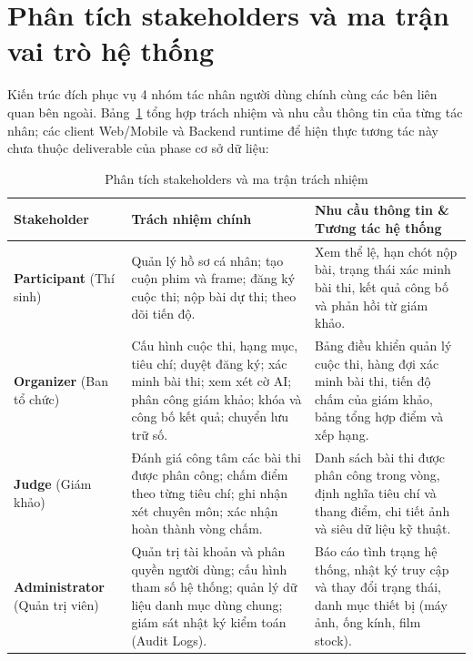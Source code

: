 \clearpage
\section{Phân tích stakeholders và ma trận vai trò hệ thống}
\label{s:c1_stakeholders}

Kiến trúc đích phục vụ 4 nhóm tác nhân người dùng chính cùng các bên liên quan bên ngoài. Bảng~\ref{tab:c1_stakeholders} tổng hợp trách nhiệm và nhu cầu thông tin của từng tác nhân; các client Web/Mobile và Backend runtime để hiện thực tương tác này chưa thuộc deliverable của phase cơ sở dữ liệu:

\begin{table}[!ht]
\centering
\caption{Phân tích stakeholders và ma trận trách nhiệm}
\label{tab:c1_stakeholders}
\small
\begin{tabularx}{\textwidth}{p{2.8cm}p{4.2cm}>{\raggedright\arraybackslash}X}
\toprule
\textbf{Stakeholder} & \textbf{Trách nhiệm chính} & \textbf{Nhu cầu thông tin \& Tương tác hệ thống} \\
\midrule
\textbf{Participant} \newline (Thí sinh) & 
Quản lý hồ sơ cá nhân; tạo cuộn phim và frame; đăng ký cuộc thi; nộp bài dự thi; theo dõi tiến độ. & 
Xem thể lệ, hạn chót nộp bài, trạng thái xác minh bài thi, kết quả công bố và phản hồi từ giám khảo. \\
\midrule
\textbf{Organizer} \newline (Ban tổ chức) & 
Cấu hình cuộc thi, hạng mục, tiêu chí; duyệt đăng ký; xác minh bài thi; xem xét cờ AI; phân công giám khảo; khóa và công bố kết quả; chuyển lưu trữ số. & 
Bảng điều khiển quản lý cuộc thi, hàng đợi xác minh bài thi, tiến độ chấm của giám khảo, bảng tổng hợp điểm và xếp hạng. \\
\midrule
\textbf{Judge} \newline (Giám khảo) & 
Đánh giá công tâm các bài thi được phân công; chấm điểm theo từng tiêu chí; ghi nhận xét chuyên môn; xác nhận hoàn thành vòng chấm. & 
Danh sách bài thi được phân công trong vòng, định nghĩa tiêu chí và thang điểm, chi tiết ảnh và siêu dữ liệu kỹ thuật. \\
\midrule
\textbf{Administrator} \newline (Quản trị viên) & 
Quản trị tài khoản và phân quyền người dùng; cấu hình tham số hệ thống; quản lý dữ liệu danh mục dùng chung; giám sát nhật ký kiểm toán (Audit Logs). & 
Báo cáo tình trạng hệ thống, nhật ký truy cập và thay đổi trạng thái, danh mục thiết bị (máy ảnh, ống kính, film stock). \\
\bottomrule
\end{tabularx}
\end{table}

